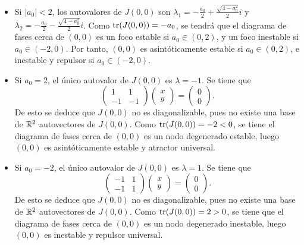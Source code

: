 \documentclass[11pt]{report}
\begin{document}
\begin{solution}
\begin{itemize}
\begin{itemize}
        \item Si $|a_0| < 2$, los autovalores de $J(0,0)$ son $\lambda_1 = -\frac{a_0}{2}+\frac{\sqrt{4-a_0^2}}{2}i$ y $\lambda_2 = -\frac{a_0}{2}-\frac{\sqrt{4-a_0^2}}{2}i$. Como $\textup{tr}(J(0,0)) = -a_0$, se tendrá que el diagrama de fases cerca de $(0,0)$ es un foco estable si $a_0 \in (0,2)$, y un foco inestable si $a_0\in (-2,0)$. Por tanto, $(0,0)$ es asintóticamente estable si $a_0\in(0,2)$, e inestable y repulsor si $a_0 \in (-2,0)$.
        \item Si $a_0 = 2$, el único autovalor de $J(0,0)$ es $\lambda = -1$. Se tiene que
        \[\left(\begin{array}{cc}
            1 & 1 \\
            -1 & -1
        \end{array}\right)\left(\begin{array}{c}
            x \\
            y
        \end{array}\right) = \left(\begin{array}{c}
            0 \\
            0
        \end{array}\right).\]
        De esto se deduce que $J(0,0)$ no es diagonalizable, pues no existe una base de $\mathbb R^2$ autovectores de $J(0,0)$. Como $\textup{tr}(J(0,0)) = -2 < 0$, se tiene el diagrama de fases cerca de $(0,0)$ es un nodo degenerado estable, luego $(0,0)$ es asintóticamente estable y atractor universal.
        \item Si $a_0 = -2$, el único autovalor de $J(0,0)$ es $\lambda = 1$. Se tiene que
        \[\left(\begin{array}{cc}
            -1 & 1 \\
            -1 & 1
        \end{array}\right)\left(\begin{array}{c}
            x \\
            y
        \end{array}\right) = \left(\begin{array}{c}
            0 \\
            0
        \end{array}\right).\]
        De esto se deduce que $J(0,0)$ no es diagonalizable, pues no existe una base de $\mathbb R^2$ autovectores de $J(0,0)$. Como $\textup{tr}(J(0,0)) = 2 > 0$, se tiene que el diagrama de fases cerca de $(0,0)$ es un nodo degenerado inestable, luego $(0,0)$ es inestable y repulsor universal.
    \end{itemize}

\end{itemize}
\end{solution}
\end{document}
